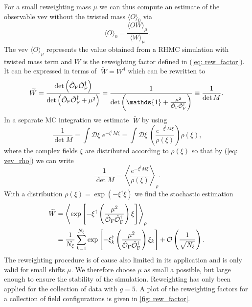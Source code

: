 %
%
For a small reweighting mass $\mu$ we can thus compute an estimate of the observable vev without the twisted mass $\langle O \rangle_{0}$ via
%
%
\begin{equation}
\langle O \rangle_{0} = \frac{\langle O W \rangle_{\mu}}{\langle W \rangle_{\mu}} .
\end{equation}
%
%
The vev $\langle O \rangle_{\mu}$ represents the value obtained from a RHMC simulation with twisted mass term and $W$ is the reweighting factor defined in (\ref{eq: rew_factor}). It can be expressed in terms of $\;\widetilde{\!W}=W^{4}$ which can be rewritten to
%
%
\begin{equation}
\widetilde{\!W} = \frac{\det \left(\hat{\mathcal{O}}_{\rm F}\hat{\mathcal{O}}_{\rm F}^{\dagger}\right)}{\det\left(\hat{\mathcal{O}}_{\rm F}\hat{\mathcal{O}}_{\rm F}^{\dagger}+ \mu^{2}\right)} = \frac{1}{\det\left( \mathds{1}+\frac{\mu^{2}}{\hat{\mathcal{O}}_{\rm F}\hat{\mathcal{O}}_{\rm F}^{\dagger}}\right)} \equiv \frac{1}{\det M}.
\end{equation}
%
%
In a separate MC integration we estimate $\;\widetilde{\!W}$ by using
%
%
\begin{equation}
\frac{1}{\det M} = \int \mathcal{D}\xi \; e^{-\xi^{\dagger}M\xi} = \int \mathcal{D}\xi\; \left(\frac{e^{-\xi^{\dagger}M\xi}}{\rho(\xi)}\right) \rho(\xi),
\end{equation}
%
%
where the complex fields $\xi$ are distributed according to $\rho(\xi)$ so that by (\ref{eq: vev_rho}) we can write
%
%
\begin{equation}
\frac{1}{\det M} = \left\langle \frac{e^{-\xi^{\dagger}M\xi}}{\rho(\xi)}\right\rangle_{\rho}.
\end{equation}
%
%
With a  distribution $\rho(\xi)=\exp(-\xi^{\dagger}\xi)$ we find the stochastic estimation
%
%
\begin{equation}
\begin{alignedat}{2}
\widetilde{\!W} &= \left\langle \exp \left[ -\xi^{\dagger}\left(\frac{\mu^{2}}{\hat{\mathcal{O}}_{\rm F}\hat{\mathcal{O}}_{\rm F}^{\dagger}}\right)\xi\right]\right\rangle_{\rho} \\
&= \frac{1}{N_{\xi}} \sum\limits_{k=1}^{N_{\xi}} \exp \left[ -\xi_{k}^{\dagger}\left(\frac{\mu^{2}}{\hat{\mathcal{O}}_{\rm F}\hat{\mathcal{O}}_{\rm F}^{\dagger}}\right)\xi_{k}\right] + \mathcal{O}\left(\frac{1}{\sqrt{N_{\xi}}}\right). 
\end{alignedat}
\end{equation}
%
%
The reweighting procedure is of cause also limited in its application and is only valid for small shifts $\mu$. We therefore choose $\mu$ as small a possible, but large enough to ensure the stability of the simulation. Reweighting has only been applied for the collection of data with $g=5$. A plot of the reweighting factors for a collection of field configurations is given in \autoref{fig: rew_factor}.
